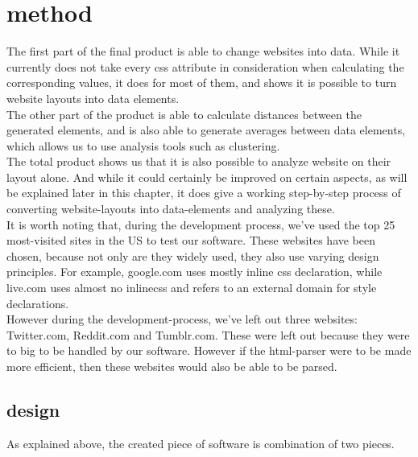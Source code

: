 \chapter{method}\label{method}
The first part of the final product is able to change websites into data. While it currently does not take every css attribute in consideration when calculating the corresponding values, it does for most of them, and shows it is possible to turn website layouts into data elements.\\
The other part of the product is able to calculate distances between the generated elements, and is also able to generate averages between data elements, which allows us to use analysis tools such as clustering.\\
The total product shows us that it is also possible to analyze website on their layout alone. And while it could certainly be improved on certain aspects, as will be explained later in this chapter, it does give a working step-by-step process of converting website-layouts into data-elements and analyzing these.\\
It is worth noting that, during the development process, we've used the top 25 most-visited sites in the US to test our software. These websites have been chosen, because not only are they widely used, they also use varying design principles. For example, google.com uses mostly inline css declaration, while live.com uses almost no inline\-css and refers to an external domain for style declarations.\\
However during the development-process, we've left out three websites: Twitter.com, Reddit.com and Tumblr.com. These were left out because they were to big to be handled by our software. However if the html-parser were to be made more efficient, then these websites would also be able to be parsed.
\section{design}
As explained above, the created piece of software is combination of two pieces.

